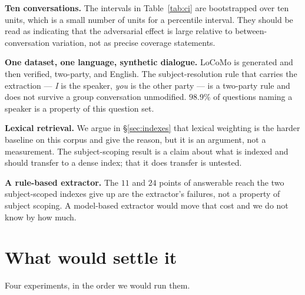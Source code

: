 \documentclass[11pt]{article}
\begin{document}
\textbf{Ten conversations.} The intervals in Table~\ref{tab:ci} are bootstrapped
over ten units, which is a small number of units for a percentile interval. They
should be read as indicating that the adversarial effect is large relative to
between-conversation variation, not as precise coverage statements.

\textbf{One dataset, one language, synthetic dialogue.} LoCoMo is generated and
then verified, two-party, and English. The subject-resolution rule that carries
the extraction --- \emph{I} is the speaker, \emph{you} is the other party ---
is a two-party rule and does not survive a group conversation unmodified.
$98.9\%$ of questions naming a speaker is a property of this question set.

\textbf{Lexical retrieval.} We argue in \S\ref{sec:indexes} that lexical
weighting is the harder baseline on this corpus and give the reason, but it is
an argument, not a measurement. The subject-scoping result is a claim about what
is indexed and should transfer to a dense index; that it does transfer is
untested.

\textbf{A rule-based extractor.} The $11$ and $24$ points of answerable reach
the two subject-scoped indexes give up are the extractor's failures, not a
property of subject scoping. A model-based extractor would move that cost and we
do not know by how much.

\section{What would settle it}
\label{sec:settle}

Four experiments, in the order we would run them.
\end{document}

